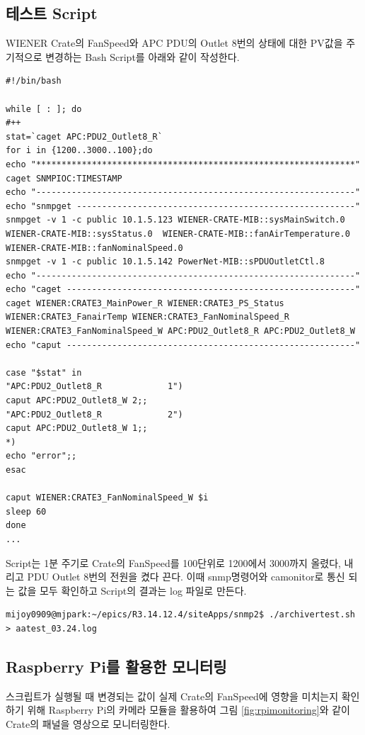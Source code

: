 \documentclass[11pt
  , a4paper
  , article
  , oneside
]{memoir}
\begin{document}
\subsection{테스트 Script}
WIENER Crate의 FanSpeed와 APC PDU의 Outlet 8번의 상태에 대한 PV값을 주기적으로 변경하는 Bash Script를 아래와 같이 작성한다. 

\begin{lstlisting}[style=termstyle]
#!/bin/bash

while [ : ]; do  
#++
stat=`caget APC:PDU2_Outlet8_R`
for i in {1200..3000..100};do
echo "***************************************************************"
caget SNMPIOC:TIMESTAMP
echo "---------------------------------------------------------------"
echo "snmpget -------------------------------------------------------"
snmpget -v 1 -c public 10.1.5.123 WIENER-CRATE-MIB::sysMainSwitch.0  WIENER-CRATE-MIB::sysStatus.0  WIENER-CRATE-MIB::fanAirTemperature.0 WIENER-CRATE-MIB::fanNominalSpeed.0
snmpget -v 1 -c public 10.1.5.142 PowerNet-MIB::sPDUOutletCtl.8
echo "---------------------------------------------------------------"
echo "caget ---------------------------------------------------------"
caget WIENER:CRATE3_MainPower_R WIENER:CRATE3_PS_Status WIENER:CRATE3_FanairTemp WIENER:CRATE3_FanNominalSpeed_R WIENER:CRATE3_FanNominalSpeed_W APC:PDU2_Outlet8_R APC:PDU2_Outlet8_W 
echo "caput ---------------------------------------------------------"

case "$stat" in
"APC:PDU2_Outlet8_R             1")
caput APC:PDU2_Outlet8_W 2;;
"APC:PDU2_Outlet8_R             2")
caput APC:PDU2_Outlet8_W 1;;
*)
echo "error";;
esac

caput WIENER:CRATE3_FanNominalSpeed_W $i
sleep 60
done
...
\end{lstlisting}

Script는 1분 주기로 Crate의 FanSpeed를 100단위로 1200에서 3000까지 올렸다, 내리고 PDU Outlet 8번의 전원을 켰다 끈다. 이때 snmp명령어와 camonitor로 통신 되는 값을 모두 확인하고 Script의 결과는 log 파일로 만든다.

\begin{lstlisting}[style=termstyle]
mijoy0909@mjpark:~/epics/R3.14.12.4/siteApps/snmp2$ ./archivertest.sh > aatest_03.24.log 
\end{lstlisting}


\subsection{Raspberry Pi를 활용한 모니터링}
스크립트가 실행될 때 변경되는 값이 실제 Crate의 FanSpeed에 영향을 미치는지 확인하기 위해 Raspberry Pi의 카메라 모듈을 활용하여 그림 \ref{fig:rpimonitoring}와 같이 Crate의 패널을 영상으로 모니터링한다.
\end{document}
